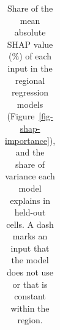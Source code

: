 \documentclass[
  letterpaper,
  twoside,
  twocolumn,
  9pt]{article}
\begin{document}
\begin{longtable}[]{@{}
  >{\raggedright\arraybackslash}p{}
  >{\raggedright\arraybackslash}p{}
  >{\raggedleft\arraybackslash}p{}
  >{\raggedleft\arraybackslash}p{}
  >{\raggedleft\arraybackslash}p{}
  >{\raggedleft\arraybackslash}p{}@{}}

\caption{\label{tbl-si-shap-importance}Share of the mean absolute SHAP
value (\%) of each input in the regional regression models
(Figure~\ref{fig-shap-importance}), and the share of variance each model
explains in held-out cells. A dash marks an input that the model does
not use or that is constant within the region.}

\tabularnewline


\end{longtable}
\end{document}
